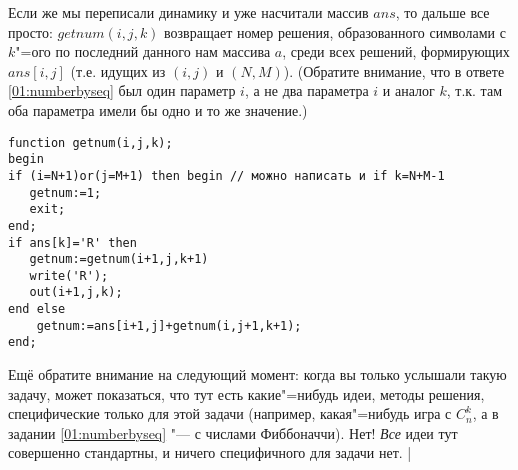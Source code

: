 Если же мы переписали динамику и уже насчитали массив $ans$, то дальше все просто:
$getnum(i,j,k)$ возвращает номер решения, образованного символами с $k$"=ого по последний данного нам 
массива $a$, среди всех решений, формирующих $ans[i,j]$ (т.е. идущих из $(i,j)$ и $(N,M)$). 
(Обратите внимание, что в ответе \ref{01:numberbyseq} был один параметр $i$, а не два параметра $i$ 
и аналог $k$, т.к. там оба параметра имели бы одно и то же значение.)
\begin{codesampleo}\begin{verbatim}
function getnum(i,j,k); 
begin
if (i=N+1)or(j=M+1) then begin // можно написать и if k=N+M-1
   getnum:=1;
   exit;
end;
if ans[k]='R' then 
   getnum:=getnum(i+1,j,k+1)
   write('R');
   out(i+1,j,k);
end else 
    getnum:=ans[i+1,j]+getnum(i,j+1,k+1);
end;
\end{verbatim}\end{codesampleo}
Ещё обратите внимание на следующий момент: когда вы только услышали такую задачу, может показаться, 
что тут есть какие"=нибудь идеи, методы решения, специфические только для этой задачи (например, 
какая"=нибудь игра с $C_n^k$, а в задании \ref{01:numberbyseq} "--- с числами Фиббоначчи). Нет!
\textit{Все} идеи тут совершенно стандартны, и ничего специфичного для задачи нет.
|\label{tortoise:numberbypath}

